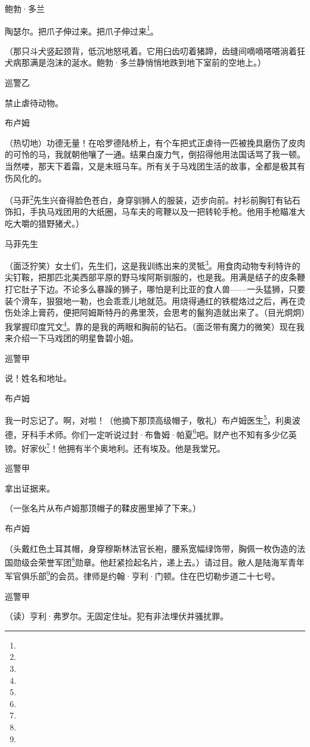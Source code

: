 \par 鲍勃·多兰
\par 陶瑟尔。把爪子伸过来。把爪子伸过来\footnote{}。
\par （那只斗犬竖起颈背，低沉地怒吼着。它用臼齿叨着猪蹄，齿缝间嘀嘀嗒嗒淌着狂犬病那满是泡沫的涎水。鲍勃·多兰静悄悄地跌到地下室前的空地上。）
\par 巡警乙
\par 禁止虐待动物。
\par 布卢姆
\par （热切地）功德无量！在哈罗德陆桥上，有个车把式正虐待一匹被挽具磨伤了皮肉的可怜的马，我就朝他嚷了一通。结果白废力气，倒招得他用法国话骂了我一顿。当然喽，那天下着霜，又是末班马车。所有关于马戏团生活的故事，全都是极其有伤风化的。
\par （马菲\footnote{}先生兴奋得脸色苍白，身穿驯狮人的服装，迈步向前。衬衫前胸钉有钻石饰扣，手执马戏团用的大纸圈，马车夫的弯鞭以及一把转轮手枪。他用手枪瞄准大吃大嚼的猎野猪犬。）
\par 马菲先生
\par （面泛狞笑）女士们，先生们，这是我训练出来的灵牴\footnote{}。用食肉动物专利特许的尖钉鞍，把那匹北美西部平原的野马埃阿斯驯服的，也是我。用满是结子的皮条鞭打它肚子下边。不论多么暴躁的狮子，哪怕是利比亚的食人兽——一头猛狮，只要装个滑车，狠狠地一勒，也会乖乖儿地就范。用烧得通红的铁棍烙过之后，再在烫伤处涂上膏药，便把阿姆斯特丹的弗里茨，会思考的鬣狗造就出来了。（目光炯炯）我掌握印度咒文\footnote{}。靠的是我的两眼和胸前的钻石。（面泛带有魔力的微笑）现在我来介绍一下马戏团的明星鲁碧小姐。
\par 巡警甲
\par 说！姓名和地址。
\par 布卢姆
\par 我一时忘记了。啊，对啦！（他摘下那顶高级帽子，敬礼）布卢姆医生\footnote{}，利奥波德，牙科手术师。你们一定听说过封·布鲁姆·帕夏\footnote{}吧。财产也不知有多少亿英镑。好家伙\footnote{}！他拥有半个奥地利。还有埃及。他是我堂兄。
\par 巡警甲
\par 拿出证据来。
\par （一张名片从布卢姆那顶帽子的鞣皮圈里掉了下来。）
\par 布卢姆
\par （头戴红色土耳其帽，身穿穆斯林法官长袍，腰系宽幅绿饰带，胸佩一枚伪造的法国勋级会荣誉军团\footnote{}勋章。他赶紧捡起名片，递上去。）请过目。敝人是陆海军青年军官俱乐部\footnote{}的会员。律师是约翰·亨利·门顿。住在巴切勒步道二十七号。
\par 巡警甲
\par （读）亨利·弗罗尔。无固定住址。犯有非法埋伏并骚扰罪。
